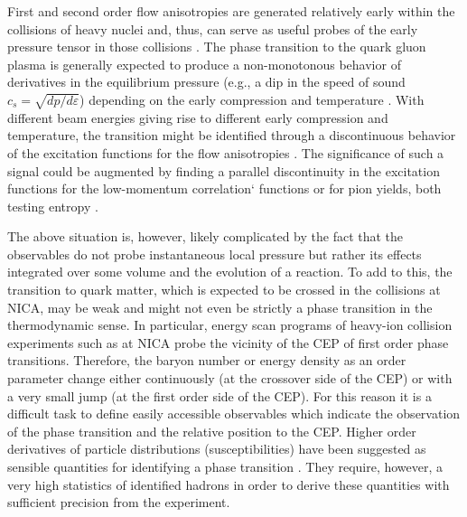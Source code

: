\documentclass[epj]{svjour}
\begin{document}
First and second order flow anisotropies are generated relatively early within
the collisions of heavy nuclei and, thus, can serve as useful probes of the
early pressure tensor in those collisions \cite{Sorge:1996pc,Shi:2001fm}.
The phase transition to the quark gluon plasma is generally expected to
produce a non-monotonous behavior of derivatives in the equilibrium pressure
(e.g., a dip in the speed of sound $c_s=\sqrt{d p/d \varepsilon}$)  depending on the  
early compression and temperature \cite{Teaney:2000cw}.
With different beam energies giving rise to different early compression and
temperature, the transition might be identified through a discontinuous
behavior of the excitation functions for the flow anisotropies 
\cite{Danielewicz:1998vz}.
The significance of such a signal could be augmented by finding a parallel
discontinuity in the excitation functions for the low-momentum correlation`
functions or for pion yields, both testing entropy \cite{Rischke:1996em}.

The above situation is, however, likely complicated by the fact that the
observables do not probe instantaneous local pressure but rather its effects
integrated over some volume and the evolution of a reaction.
To add to this, the transition to quark matter, which is expected to be crossed in the collisions
at NICA, may be weak and might not even be strictly a phase transition in the
thermodynamic sense.
In particular,  energy scan programs of heavy-ion collision
experiments such as at NICA probe the vicinity of the CEP
of first order phase transitions.
Therefore,  the baryon number or energy density as an order parameter change 
either continuously (at the crossover side of the CEP)
or with a very small jump (at the first order side of the CEP).
For this reason it is a difficult task to define easily accessible
observables which indicate the observation of the phase transition
and the relative position to the CEP.
Higher order derivatives of particle distributions (susceptibilities) have
been suggested as sensible quantities for identifying a phase transition
\cite{Friman:2011pf}.
They require, however, a very high statistics of identified hadrons in order
to derive these quantities with sufficient precision from the experiment.
\end{document}
